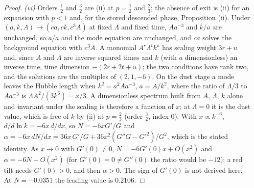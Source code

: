 \begin{proof}
\emph{(vi)} Orders $\tfrac12$ and $\tfrac32$ are (ii) at $p = \tfrac12$ and $\tfrac23$; the absence of exit is (ii) for an expansion with $p < 1$ and, for the stored descended phase, Proposition (ii). Under $(a, k, A) \to (ca, ck, c^{3}A)$ at fixed $\Lambda$ and fixed time, $Aa^{-3}$ and $k/a$ are unchanged, so $\dot a/a$ and the mode equation are unchanged, and $ca$ solves the background equation with $c^{3}A$. A monomial $A^{r}\Lambda^{t}k^{u}$ has scaling weight $3r + u$ and, since $A$ and $\Lambda$ are inverse squared times and $k$ (with $a$ dimensionless) an inverse time, time dimension $-(2r + 2t + u)$; the two conditions have rank two, and the solutions are the multiples of $(2, 1, -6)$. On the dust stage a mode leaves the Hubble length when $k^{2} = a^{2}Aa^{-3}$, $a = A/k^{2}$, where the ratio of $\Lambda/3$ to $Aa^{-3}$ is $\Lambda A^{2}/(3k^{6}) = x/3$. A dimensionless spectrum built from $A$, $\Lambda$, $k$ alone and invariant under the scaling is therefore a function of $x$; at $\Lambda = 0$ it is the dust value, which is free of $k$ by (ii) at $p = \tfrac23$ (order $\tfrac32$, index $0$). With $x \propto k^{-6}$, $d/d\ln k = -6x\,d/dx$, so $N = -6xG'/G$ and $\alpha = -6x\,dN/dx = 36x\,G'/G + 36x^{2}(G''G - G'^{2})/G^{2}$, which is the stated identity. As $x \to 0$ with $G'(0) \ne 0$, $N = -6G'(0)x + O(x^{2})$ and $\alpha = -6N + O(x^{2})$ (for $G'(0) = 0 \ne G''(0)$ the ratio would be $-12$); a red tilt needs $G'(0) > 0$, and then $\alpha > 0$. The sign of $G'(0)$ is not derived here. At $N = -0.0351$ the leading value is $0.2106$.
\end{proof}
